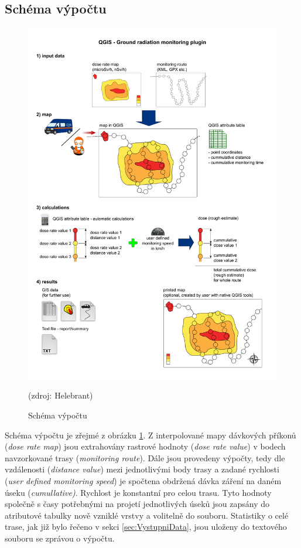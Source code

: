 \subsection{Schéma výpočtu}
\begin{figure}[H]
    \centering
    \includegraphics[scale=0.4]{./pictures/computation_scheme.png}
      	\caption[Schéma výpočtu]{Schéma výpočtu}(zdroj: Helebrant)
    	\label{fig:SchemeOfComputation}
\end{figure}

Schéma výpočtu je zřejmé z obrázku \ref{fig:SchemeOfComputation}. Z interpolované mapy dávkových příkonů (\textit{dose rate map}) jsou extrahovány rastrové hodnoty (\textit{dose rate value}) v bodech navzorkované trasy (\textit{monitoring route}). Dále jsou provedeny výpočty, tedy dle vzdálenosti (\textit{distance value}) mezi jednotlivými body trasy a zadané rychlosti (\textit{user defined monitoring speed}) je spočtena obdržená dávka záření na daném úseku (\textit{cumullative)}. Rychlost je konstantní pro celou trasu. Tyto hodnoty společně s časy potřebnými na projetí jednotlivých úseků jsou zapsány do atributové tabulky nově vzniklé vrstvy a volitelně do  souboru. Statistiky o celé trase, jak již bylo řečeno v sekci \ref{sec:VystupniData}, jsou uloženy do textového souboru se zprávou o výpočtu.

